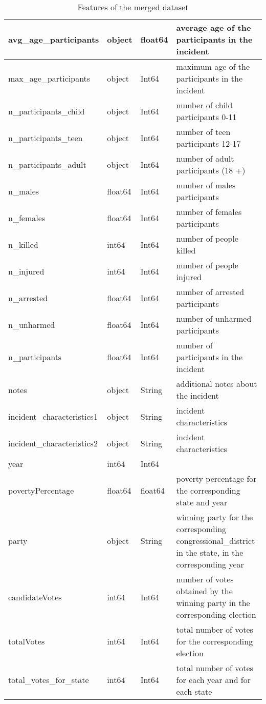 \documentclass[10pt,a4paper]{report}
\begin{document}
\begin{table}
\begin{small}
\begin{tabular}{|l|l|l|p{7cm}|}
		\hline
		avg\_age\_participants & object & float64 & average age of the participants in the incident\\
		\hline
		max\_age\_participants & object & Int64 & maximum age of the participants in the incident\\
		\hline
		n\_participants\_child & object & Int64 & number of child participants 0-11\\
		\hline
		n\_participants\_teen & object & Int64 & number of teen participants 12-17\\
		\hline
		n\_participants\_adult & object & Int64 & number of adult participants (18 +)\\
		\hline
		n\_males & float64 & Int64 & number of males participants\\
		\hline
		n\_females & float64 & Int64 & number of females participants\\
		\hline
		n\_killed & int64 & Int64 & number of people killed\\
		\hline
		n\_injured & int64 & Int64 & number of people injured\\
		\hline
		n\_arrested & float64 & Int64 & number of arrested participants\\
		\hline
		n\_unharmed & float64 & Int64 & number of unharmed participants\\
		\hline
		n\_participants & float64 & Int64 & number of participants in the incident\\
		\hline
		notes & object & String & additional notes about the incident\\
		\hline
		incident\_characteristics1 & object & String & incident characteristics\\
		\hline
		incident\_characteristics2 & object & String & incident characteristics\\
		\hline
		year & int64 & Int64 & \\
		\hline
		povertyPercentage & float64 & float64 & poverty percentage for the corresponding state and year\\
		\hline
		party & object & String & winning party for the corresponding congressional\_district in the state, in the corresponding year\\
		\hline
		candidateVotes & int64 & Int64 & number of votes obtained by the winning party in the corresponding election\\
		\hline
		totalVotes & int64 & Int64 & total number of votes for the corresponding election\\
		\hline
		total\_votes\_for\_state & int64 & Int64 & total number of votes for each year and for each state\\
		\hline
	\end{tabular}
	\end{small}
	\caption{Features of the merged dataset}
	\label{table01}
\end{table}
\end{document}
